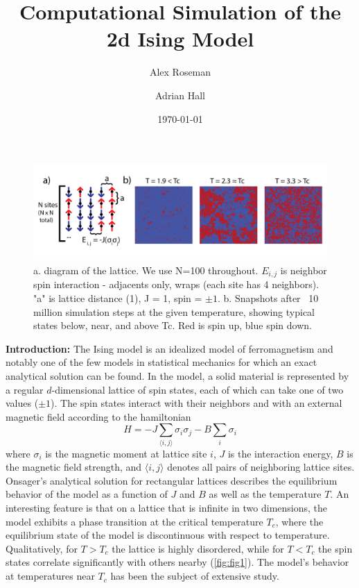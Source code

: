 \documentclass[letter,scriptaddress,twocolumn, prl]{revtex4}
\begin{document}
\title{Computational Simulation of the 2d Ising Model}

\author{Alex Roseman}
\author{Adrian Hall}
\date{\today}

\begin{abstract}

\end{abstract}

\maketitle

\begin{figure}[t]
	\begin{center}
		\includegraphics[width=1\textwidth]{figs/fig1.png}
		\caption{a. diagram of the lattice. We use N=100 throughout. $E_{i, j}$ is neighbor spin interaction - adjacents only, wraps (each site has 4 neighbors). "a" is lattice distance (1), J = 1, spin = $\pm 1$. b. Snapshots after ~10 million simulation steps at the given temperature, showing typical states below, near, and above Tc. Red is spin up, blue spin down.}
		\label{fig:fig1}
	\end{center}
\end{figure}

\textbf{Introduction:} The Ising model is an idealized model of ferromagnetism and notably one of the few models in statistical mechanics for which an exact analytical solution can be found. In the model, a solid material is represented by a regular $d$-dimensional lattice of spin states, each of which can take one of two values ($\pm 1$). The spin states interact with their neighbors and with an external magnetic field according to the hamiltonian
\begin{equation}
	H = -J \sum_{\langle i, j \rangle} \sigma_i \sigma_j - B \sum_i \sigma_i
\end{equation}
where $\sigma_i$ is the magnetic moment at lattice site $i$, $J$ is the interaction energy, $B$ is the magnetic field strength, and $\langle i, j \rangle$ denotes all pairs of neighboring lattice sites.
Onsager's analytical solution for rectangular lattices \cite{Onsager} describes the equilibrium behavior of the model as a function of $J$ and $B$ as well as the temperature $T$. An interesting feature is that on a lattice that is infinite in two dimensions, the model exhibits a phase transition at the critical temperature $T_c$, where the equilibrium state of the model is discontinuous with respect to temperature. Qualitatively, for $T > T_c$ the lattice is highly disordered, while for $T < T_c$ the spin states correlate significantly with others nearby (\autoref{fig:fig1}).
The model's behavior at temperatures near $T_c$ has been the subject of extensive study.
\end{document}
